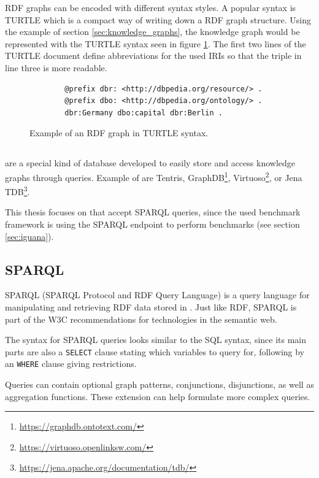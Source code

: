 RDF graphs can be encoded with different syntax styles.
A popular syntax is TURTLE \cite{RDFTurtle} which is a compact way of writing down a RDF graph structure.
Using the example of section \ref{sec:knowledge_graphs}, the knowledge graph would be represented with the TURTLE syntax seen in figure \ref{fig:rdf_turtle}.
The first two lines of the TURTLE document define abbreviations for the used IRIs so that the triple in line three is more readable.

\begin{figure}[tbph]
	\begin{lstlisting}
		@prefix dbr: <http://dbpedia.org/resource/> .
		@prefix dbo: <http://dbpedia.org/ontology/> .
		dbr:Germany dbo:capital dbr:Berlin .
	\end{lstlisting}
	\caption{Example of an RDF graph in TURTLE syntax.}
	\label{fig:rdf_turtle}
\end{figure}


\subsection{\ts{}}
\label{sec:triplestores}
\tsp{} are a special kind of database developed to easily store and access knowledge graphs through queries.
Example of \tsp{} are Tentris\cite{bigerlTentrisTensorBasedTriple2020}, GraphDB\footnote{\url{https://graphdb.ontotext.com/}}, Virtuoso\footnote{\url{https://virtuoso.openlinksw.com/}}, or Jena TDB\footnote{\url{https://jena.apache.org/documentation/tdb/}}.

This thesis focuses on \tsp{} that accept SPARQL queries, since the used benchmark framework \iguana{} is using the SPARQL endpoint to perform benchmarks (see section \ref{sec:iguana}).


\subsection{SPARQL}
\label{sec:sparql}
SPARQL (SPARQL Protocol and RDF Query Language)\cite{harrisSPARQLQueryLanguage} is a query language for manipulating and retrieving RDF data stored in \tsp{}.
Just like RDF, SPARQL is part of the W3C recommendations for technologies in the semantic web.

The syntax for SPARQL queries looks similar to the SQL syntax, since its main parts are also a \texttt{SELECT} clause stating which variables to query for, following by an \texttt{WHERE} clause giving restrictions.

Queries can contain optional graph patterns, conjunctions, disjunctions, as well as aggregation functions.
These extension can help formulate more complex queries.

